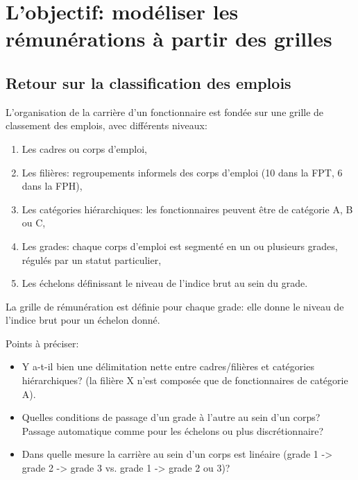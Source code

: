 \documentclass[11pt,a4paper]{article}
\begin{document}
\else \fi



\section{L'objectif: modéliser les rémunérations à partir des grilles}


\subsection*{Retour sur la classification des emplois}

L'organisation de la carrière d'un fonctionnaire est fondée sur une grille de classement des emplois, avec différents niveaux:
 
\begin{enumerate}[leftmargin=1cm ,parsep=0cm,itemsep=0cm,topsep=0cm] 
\item Les cadres ou corps d'emploi,
\item Les filières: regroupements informels des corps d'emploi (10 dans la FPT, 6 dans la FPH), 
\item Les catégories hiérarchiques: les fonctionnaires peuvent être de catégorie A, B ou C,
\item Les grades: chaque corps d'emploi est segmenté en un ou plusieurs grades, régulés par un statut particulier,
\item Les échelons définissant le niveau de l'indice brut au sein du grade. 
\end{enumerate}


\vspace{0.5cm}

La grille de rémunération est définie pour chaque grade: elle donne le niveau de l'indice brut pour un échelon donné. 


Points à préciser: 
\begin{itemize}[leftmargin=1cm ,parsep=0cm,itemsep=0cm,topsep=0cm] 
\item Y a-t-il bien une délimitation nette entre cadres/filières et catégories hiérarchiques? (la filière X n'est composée que de fonctionnaires de catégorie A). 
\item Quelles conditions de passage d'un grade à l'autre au sein d'un corps? Passage automatique comme pour les échelons ou plus discrétionnaire? %
\item Dans quelle mesure la carrière au sein d'un corps est linéaire (grade 1 -> grade 2 -> grade 3 vs. grade 1 -> grade 2 ou 3)? 
\end{itemize}
\end{document}
